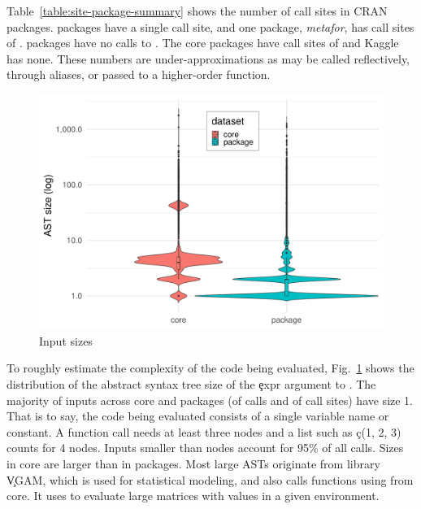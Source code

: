 \documentclass[conference]{IEEEtran}
\begin{document}
Table~\ref{table:site-package-summary} shows the number of call sites in
CRAN packages. \OneCallSitesEnrich packages have a single call site, and one package, \emph{metafor}, has \MaxCallSitesEnrich
call sites of \eval. \NoCallSitesEnrich packages have no calls to \eval. The core packages
have \NbCoreEvalCallSites call sites of \eval and Kaggle has none. These numbers are
under-approximations as \eval may be called reflectively, through aliases,
or passed to a higher-order function.

\begin{table}[ht]
\caption{Distribution of callsites in CRAN}
\label{table:site-package-summary}
\end{table}

\begin{figure}[!b]
	\centering
\includegraphics[width=\columnwidth]{ast_sizes}
\caption{Input sizes} \label{fig:ast-size}
\end{figure}

To roughly estimate the complexity of the code being evaluated,
Fig.~\ref{fig:ast-size} shows the distribution of the abstract syntax tree
size of the \c{expr} argument to \eval. The majority of inputs across core
and packages (\NbAstOnePercent of \eval calls and \NbAstOneCallSitePercent
of call sites) have size 1. That is to say, the code being evaluated
consists of a single variable name or constant. A function call needs at
least three nodes and a list such as \c{c(1, 2, 3)} counts for 4
nodes. Inputs smaller than \AstSizeNineFive nodes account for 95\% of all
calls. Sizes in core are larger than in packages. Most large ASTs originate
from library \c{VGAM}, which is used for statistical modeling, and also calls functions using \eval from core. It uses
\eval to evaluate large matrices with values in a given environment.
\end{document}
